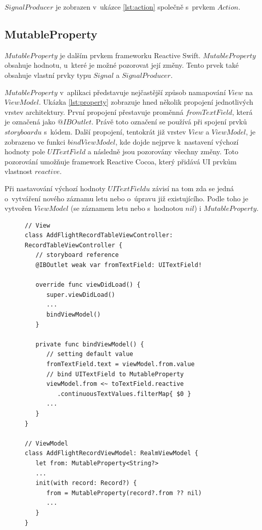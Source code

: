 \documentclass[thesis=M,czech]{FITthesis}[2012/06/26]
\begin{document}
$SignalProducer$ je zobrazen v~ukázce \ref{lst:action} společně s~prvkem $Action$.

\subsection{MutableProperty}
$MutableProperty$ je dalším prvkem frameworku Reactive Swift. $MutableProperty$ obsahuje hodnotu, u~které je možné pozorovat její změny. Tento prvek také obsahuje vlastní prvky typu $Signal$ a $SignalProducer$. \cite{property}

$MutableProperty$ v~aplikaci představuje nejčastější způsob namapování $View$ na $ViewModel$. Ukázka \ref{lst:property} zobrazuje hned několik propojení jednotlivých vrstev architektury. První propojení přestavuje proměnná $fromTextField$, která je označená jako $@IBOutlet$. Právě toto označení se používá při spojení prvků $storyboardu$ s~kódem. Další propojení, tentokrát již vrstev $View$ a $ViewModel$, je zobrazeno ve funkci $bindViewModel$, kde dojde nejprve k~nastavení výchozí hodnoty pole $UITextField$ a následně jsou pozorovány všechny změny. Toto pozorování umožňuje framework Reactive Cocoa, který přidává UI prvkům vlastnost $reactive$.

Při nastavování výchozí hodnoty $UITextFieldu$ závisí na tom zda se jedná o~vytváření nového záznamu letu nebo o~úpravu již existujícího. Podle toho je vytvořen $ViewModel$ (se záznamem letu nebo s~hodnotou $nil$) i $MutableProperty$.

\begin{figure}
\begin{minipage}{\linewidth}
\begin{lstlisting}[caption={Ukázka propojení $View$ a $ViewModel$},label={lst:property}]
// View
class AddFlightRecordTableViewController: 
RecordTableViewController {
   // storyboard reference
   @IBOutlet weak var fromTextField: UITextField!

   override func viewDidLoad() {
      super.viewDidLoad()
      ...
      bindViewModel()
   }

   private func bindViewModel() {
      // setting default value
      fromTextField.text = viewModel.from.value
      // bind UITextField to MutableProperty
      viewModel.from <~ toTextField.reactive
         .continuousTextValues.filterMap{ $0 }
      ...
   }
}

// ViewModel
class AddFlightRecordViewModel: RealmViewModel {
   let from: MutableProperty<String?>
   ...
   init(with record: Record?) {
      from = MutableProperty(record?.from ?? nil)
      ...
   }
}
\end{lstlisting}
\end{minipage}
\end{figure}	
\end{document}
